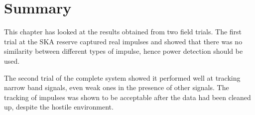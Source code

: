 \section{Summary}
This chapter has looked at the results obtained from two field trials. The first trial at the SKA reserve captured real impulses and showed that there was no similarity between different types of impulse, hence power detection should be used.

The second trial of the complete system showed it performed well at tracking narrow band signals, even weak ones in the presence of other signals. The tracking of impulses was shown to be acceptable after the data had been cleaned up, despite the hostile environment.
